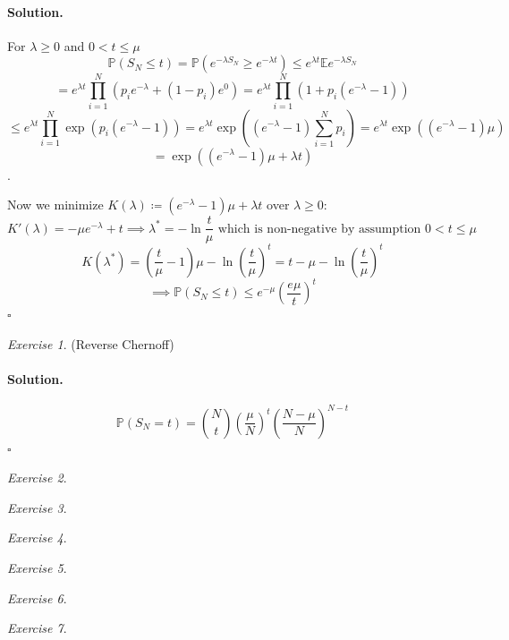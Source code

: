 \documentclass[11pt]{article}
\theoremstyle{definition}
\theoremstyle{remark}
\newtheorem{exercise}{Exercise}[section]
\newenvironment{solution}{\paragraph{Solution.}}{\hfill$\square$\medskip}
\newcommand{\E}{\mathbb{E}}
\newcommand{\Prob}{\mathbb{P}}
\newcommand{\1}{\mathbf{1}}
\begin{document}
	
\begin{solution}
	For \(\lambda \geq 0\) and \(0 < t \leq \mu\)
	\[
	\Prob(S_N \leq t) = \Prob(e^{-\lambda S_N}\geq e^{-\lambda t}) \leq e^{\lambda t} \E e^{-\lambda S_N}
	\]
	\[
	= e^{\lambda t} \prod_{i=1}^{N} ( p_i e^{-\lambda} + (1-p_i)e^0 ) = 
	 e^{\lambda t} \prod_{i=1}^{N} (1 + p_i (e^{-\lambda} - 1) )
	\]
	\[
	\leq e^{\lambda t} \prod_{i=1}^{N} \exp(p_i (e^{-\lambda} - 1)) = e^{\lambda t} \exp( (e^{-\lambda} - 1) \sum_{i=1}^{N} p_i ) = 
	e^{\lambda t} \exp( (e^{-\lambda} - 1) \mu )
	\]
	\[
	= \exp( (e^{-\lambda} - 1) \mu + \lambda t )
	\].
	
	Now we minimize \(K(\lambda) \coloneq  (e^{-\lambda} - 1) \mu + \lambda t \) over \(\lambda \geq 0\):
	\[
	K'(\lambda) =  -\mu e^{-\lambda} + t \implies \lambda^* = - \ln \frac{t}{\mu} \text{  which is non-negative by assumption } 0 < t \leq \mu
	\]
	\[
	K(\lambda^*) = (\frac{t}{\mu} - 1 )\mu - \ln (\frac{t}{\mu})^t = t - \mu - \ln (\frac{t}{\mu})^t
	\]
	\[
	\implies \Prob(S_N \leq t) \leq e^{-\mu} (\frac{e \mu}{t})^t
	\]
\end{solution}

\begin{exercise}
	(Reverse Chernoff)
\end{exercise}

\begin{solution}
	\[
	\Prob(S_N = t) = { N \choose t } (\frac{\mu}{N})^t (\frac{N-\mu}{N})^{N-t}
	\]
\end{solution}

\begin{exercise}
	
\end{exercise}

\begin{exercise}
	
\end{exercise}

\begin{exercise}
	
\end{exercise}

\begin{exercise}
	
\end{exercise}

\begin{exercise}
	
\end{exercise}

\begin{exercise}
	
\end{exercise}
\end{document}

